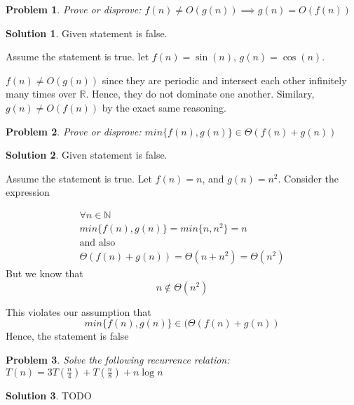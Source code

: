 \documentclass{article}
\newtheorem{problem}{Problem}
\theoremstyle{definition}
\newtheorem*{solution}{Solution}
\begin{document}
\begin{problem}
Prove or disprove: $f(n) \neq O(g(n)) \implies g(n) = O(f(n))$
\end{problem}
\begin{solution}
	Given statement is false.
	
	Assume the statement is true. let $f(n) = \sin(n)$, $g(n) = \cos(n)$.
	
	$f(n) \neq O(g(n))$ since they are periodic and intersect each other
	infinitely many times over $\mathbb R$. Hence, they do not dominate
	one another. Similary, $g(n) \neq O(f(n))$ by the exact same reasoning.
\end{solution}


\begin{problem}
Prove or disprove: $min \{ f(n), g(n) \} \in \Theta(f(n) + g(n))$
\end{problem}
\begin{solution}
	Given statement is false.
	
	Assume the statement is true. Let $f(n) = n$, and $g(n) = n^2$. Consider the expression
	
	\begin{gather*}
	\forall n \in \mathbb N \\
	min \{f(n), g(n) \} = min \{n, n^{2} \} = n \\
	\text{and also} \\
	\Theta(f(n) + g(n)) = \Theta(n + n^{2}) = \Theta(n^{2})
	\end{gather*}
But we know that
$$
n \notin \Theta(n^{2})
$$

This violates our assumption that 
$$
min \{ f(n), g(n) \} \in (\Theta(f(n) + g(n))
$$
Hence, the statement is false
\end{solution}

\begin{problem}
Solve the following recurrence relation: $T(n) = 3T(\frac n 4) + T(\frac n 8) + n \log n$
\end{problem}
\begin{solution}
	TODO
\end{solution}
\end{document}
